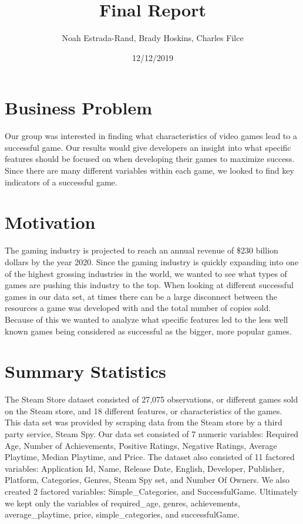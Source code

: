 \documentclass[]{article}
\title{Final Report}
\author{Noah Estrada-Rand, Brady Hoskins, Charles Filce}
\date{12/12/2019}
\begin{document}
\maketitle

\hypertarget{business-problem}{%
\section{Business Problem}\label{business-problem}}

Our group was interested in finding what characteristics of video games
lead to a successful game. Our results would give developers an insight
into what specific features should be focused on when developing their
games to maximize success. Since there are many different variables
within each game, we looked to find key indicators of a successful game.

\hypertarget{motivation}{%
\section{Motivation}\label{motivation}}

The gaming industry is projected to reach an annual revenue of \$230
billion dollars by the year 2020. Since the gaming industry is quickly
expanding into one of the highest grossing industries in the world, we
wanted to see what types of games are pushing this industry to the top.
When looking at different successful games in our data set, at times
there can be a large disconnect between the resources a game was
developed with and the total number of copies sold. Because of this we
wanted to analyze what specific features led to the less well known
games being considered as successful as the bigger, more popular games.

\hypertarget{summary-statistics}{%
\section{Summary Statistics}\label{summary-statistics}}

The Steam Store dataset consisted of 27,075 observations, or different
games sold on the Steam store, and 18 different features, or
characteristics of the games. This data set was provided by scraping
data from the Steam store by a third party service, Steam Spy. Our data
set consisted of 7 numeric variables: Required Age, Number of
Achievements, Positive Ratings, Negative Ratings, Average Playtime,
Median Playtime, and Price. The dataset also consisted of 11 factored
variables: Application Id, Name, Release Date, English, Developer,
Publisher, Platform, Categories, Genres, Steam Spy set, and Number Of
Owners. We also created 2 factored variables: Simple\_Categories, and
SuccessfulGame. Ultimately we kept only the variables of required\_age,
genres, achievements, average\_playtime, price, simple\_categories, and
successfulGame.
\end{document}
